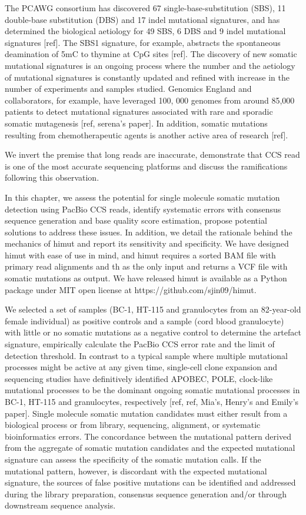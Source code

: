 The PCAWG consortium has discovered 67 single-base-substitution (SBS), 11 double-base substitution (DBS) and 17 indel mutational signatures, and has determined the biological aetiology for 49 SBS, 6 DBS and 9 indel mutational signatures [ref]. The SBS1 signature, for example, abstracts the spontaneous deamination of 5mC to thymine at CpG sites [ref]. The discovery of new somatic mutational signatures is an ongoing process where the number and the aetiology of mutational signatures is constantly updated and refined with increase in the number of experiments and samples studied. Genomics England and collaborators, for example, have leveraged 100, 000 genomes from around 85,000 patients to detect mutational signatures associated with rare and sporadic somatic mutagenesis [ref, serena’s paper]. In addition, somatic mutations resulting from chemotherapeutic agents is another active area of research [ref]. 

We invert the premise that long reads are inaccurate, demonstrate that CCS read is one of the most accurate sequencing platforms and discuss the ramifications following this observation.

In this chapter, we assess the potential for single molecule somatic mutation detection using PacBio CCS reads, identify systematic errors with consensus sequence generation and base quality score estimation, propose potential solutions to address these issues. In addition, we detail the rationale behind the mechanics of himut and report its sensitivity and specificity. We have designed himut with ease of use in mind, and himut requires a sorted BAM file with primary read alignments and th as the only input and returns a VCF file with somatic mutations as output. We have released himut is available as a Python package under MIT open license at https://github.com/sjin09/himut.

We selected a set of samples (BC-1, HT-115 and granulocytes from an 82-year-old female individual) as positive controls and a sample (cord blood granulocyte) with little or no somatic mutations as a negative control to determine the artefact signature, empirically calculate the PacBio CCS error rate and the limit of detection threshold. In contrast to a typical sample where multiple mutational processes might be active at any given time, single-cell clone expansion and sequencing studies have definitively identified APOBEC, POLE, clock-like mutational processes to be the dominant ongoing somatic mutational processes in BC-1, HT-115 and granulocytes, respectively [ref, ref, Mia’s, Henry’s and Emily’s paper]. Single molecule somatic mutation candidates must either result from a biological process or from library, sequencing, alignment, or systematic bioinformatics errors. The concordance between the mutational pattern derived from the aggregate of somatic mutation candidates and the expected mutational signature can assess the specificity of the somatic mutation calls. If the mutational pattern, however, is discordant with the expected mutational signature, the sources of false positive mutations can be identified and addressed during the library preparation, consensus sequence generation and/or through downstream sequence analysis.


